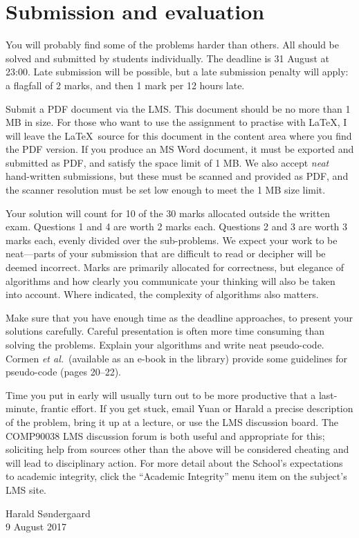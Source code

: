 \documentclass[11pt]{article}
\begin{document}
\section*{Submission and evaluation}
You will probably find some of the problems harder than others.
All should be solved and submitted by students individually.
The deadline is 31 August at 23:00.
Late submission will be possible, but a late submission penalty will
apply: a flagfall of 2 marks, and then 1 mark per 12 hours late.

Submit a PDF document via the LMS.
This document should be no more than 1 MB in size.
For those who want to use the assignment to practise with \LaTeX,
I will leave the \LaTeX\ source for this document in the
content area where you find the PDF version.
If you produce an MS Word document, it must be exported
and submitted as PDF, and satisfy the space limit of 1 MB.
We also accept \emph{neat} hand-written submissions, but these must be
scanned and provided as PDF, and the scanner resolution must be set low
enough to meet the 1 MB size limit.

Your solution will count for 10 of the 30 marks allocated outside the
written exam.
Questions 1 and 4 are worth 2 marks each.
Questions 2 and 3 are worth 3 marks each, evenly divided over the
sub-problems.
We expect your work to be neat---parts of your submission
that are difficult to read or decipher will be deemed incorrect.
Marks are primarily allocated for correctness, but elegance of
algorithms and how clearly you communicate your thinking will
also be taken into account.
Where indicated, the complexity of algorithms also matters.

Make sure that you have enough time as the deadline approaches,
to present your solutions carefully.
Careful presentation is often more time consuming than solving
the problems.
Explain your algorithms and write neat pseudo-code.
Cormen \emph{et al.}\ (available as an e-book in the library)
provide some guidelines for pseudo-code (pages 20--22).

Time you put in early will usually turn out to be more productive that
a last-minute, frantic effort.
If you get stuck, email Yuan or Harald a precise description of the
problem, bring it up at a lecture, or use the LMS discussion board.
The COMP90038 LMS discussion forum is both useful and appropriate
for this;
soliciting help from sources other than the above
will be considered cheating and will lead to disciplinary action.
For more detail about the School's expectations to academic integrity,
click the ``Academic Integrity'' menu item on the subject's LMS site.

\begin{flushright}
Harald S{\o}ndergaard 
\\ 9 August 2017
\end{flushright}
\end{document}
